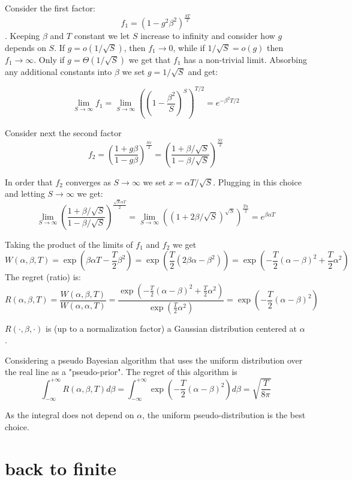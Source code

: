 \documentclass{article}
\begin{document}
Consider the first factor:$$f_1=(1-g^2 \beta^2)^{\frac{ST}{2}}$$. Keeping $\beta$ and $T$ constant we let $S$ increase to infinity and consider how $g$ depends on $S$.  
If $g = o(1/\sqrt{S})$, then $f_1 \to 0$, while if $1/\sqrt{S} = o(g)$ then $f_1 \to \infty$. Only if $g = \Theta(1/\sqrt{S})$ we get that $f_1$ has a non-trivial limit.
Absorbing any additional constants into $\beta$ we set $g = 1/\sqrt{S}$ and get:

$$ \lim_{S \to \infty} f_1 = \lim_{S \to \infty} \left( \left(1-\frac{\beta^2}{S}\right)^S \right)^{T/2} = e^{-\beta^2 T / 2}$$

Consider next the second factor $$f_2 = \left( \frac{1+g\beta}{1-g \beta}\right)^{\frac{Sx}{2}} = \left( \frac{1+\beta/\sqrt{S}}{1- \beta/\sqrt{S}}\right)^{\frac{Sx}{2}}$$

In order that $f_2$ converges as $S \to \infty$ we set $x = \alpha T / \sqrt{S}$.
Plugging in this choice and letting $S \to \infty$ we get: 
\[
\lim_{S \to \infty} \left( \frac{1+\beta/\sqrt{S}}{1- \beta/\sqrt{S}}\right)^{\frac{\sqrt{S} \alpha T}{2}} = 
\lim_{S \to \infty} \left(\left( 1+2 \beta/\sqrt{S}\right)^{\sqrt{S}} \right)^{\frac{T \alpha}{2}}
=e^{\beta\alpha T }
\]

Taking the product of the limits of $f_1$ and $f_2$ we get
\[
W(\alpha,\beta,T) = \exp \left( \beta \alpha T - \frac{T}{2} \beta^2 \right)  =
\exp \left( \frac{T}{2} \left( 2 \beta \alpha - \beta^2 \right) \right) =
\exp \left( -\frac{T}{2} \left( \alpha - \beta \right)^2 + \frac{T}{2} \alpha^2 \right)
\]
The regret (ratio) is:
\[
R(\alpha,\beta,T) = \frac{W(\alpha,\beta,T)}{W(\alpha,\alpha,T)} = 
\frac{\exp \left( -\frac{T}{2} \left( \alpha - \beta \right)^2 + \frac{T}{2} \alpha^2 \right)}{\exp \left( \frac{T}{2} \alpha^2 \right)} = \exp \left( -\frac{T}{2} \left( \alpha - \beta \right)^2 \right)
\]

$R(\cdot,\beta,\cdot)$ is (up to a normalization factor) a Gaussian distribution centered at $\alpha$.

Considering a pseudo Bayesian algorithm that uses the uniform distribution over the real line as a "pseudo-prior". The regret of this algorithm is
\[\int_{-\infty}^{+\infty} R(\alpha,\beta,T) d\beta
= \int_{-\infty}^{+\infty} \exp \left( -\frac{T}{2} \left( \alpha - \beta \right)^2 \right) d\beta
= \sqrt{\frac{T}{8 \pi}}
\]

As the integral does not depend on $\alpha$, the uniform pseudo-distribution is the best choice.

\section{back to finite}
\end{document}
